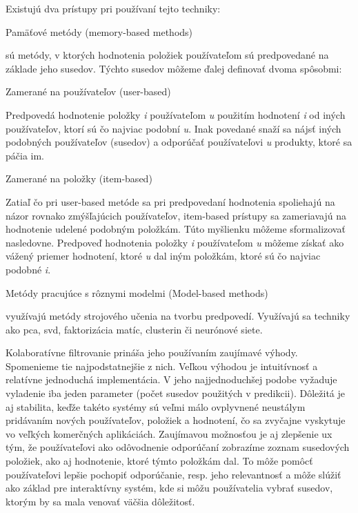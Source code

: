 Existujú dva prístupy pri používaní tejto techniky:
\begin{enumerate}
	{\bf \item Pamäťové metódy (memory-based methods)} sú metódy, v ktorých hodnotenia položiek používateľom sú predpovedané na základe jeho susedov. Týchto susedov môžeme ďalej definovať dvoma spôsobmi: \cite{rs3}
\begin{itemize}[leftmargin=*]
	{\bf \item Zamerané na používateľov (user-based)}\newline	
Predpovedá hodnotenie položky \textit{i} používateľom \textit{u} použitím hodnotení \textit{i} od iných používateľov, ktorí sú čo najviac podobní \textit{u}. Inak povedané snaží sa nájsť iných podobných používateľov (susedov) a odporúčať používateľovi \textit{u} produkty, ktoré sa páčia im.
	{\bf \item Zamerané na položky (item-based)} \newline
Zatiaľ čo pri user-based metóde sa pri predpovedaní hodnotenia spoliehajú na názor rovnako zmýšľajúcich používateľov, item-based prístupy sa zameriavajú na hodnotenie udelené podobným položkám. Túto myšlienku môžeme sformalizovať nasledovne. Predpoveď hodnotenia položky \textit{i} používateľom \textit{u} môžeme získať ako vážený priemer hodnotení, ktoré \textit{u} dal iným položkám, ktoré sú čo najviac podobné \textit{i}. \cite{rs1}
\end{itemize}
	{\bf \item Metódy pracujúce s rôznymi modelmi (Model-based methods)} využívajú metódy strojového učenia na tvorbu predpovedí. Využívajú sa techniky ako \acrshort{pca}, \acrshort{svd}, faktorizácia matíc, clusterin či neurónové siete. \cite{rs3} \\
\end{enumerate}

Kolaboratívne filtrovanie prináša jeho používaním zaujímavé výhody. Spomenieme tie najpodstatnejšie z nich. Veľkou výhodou je intuitívnosť a relatívne jednoduchá implementácia. V jeho najjednoduchšej podobe vyžaduje vyladenie iba jeden parameter (počet susedov použitých v predikcii). Dôležitá je aj stabilita, keďže takéto systémy sú veľmi málo ovplyvnené neustálym pridávaním nových používateľov, položiek a hodnotení, čo sa zvyčajne vyskytuje vo veľkých komerčných aplikáciách.
Zaujímavou možnosťou je aj zlepšenie \acrshort{ux} tým, že používateľovi ako odôvodnenie odporúčaní zobrazíme zoznam susedových položiek, ako aj hodnotenie, ktoré týmto položkám dal. To môže pomôcť používateľovi lepšie pochopiť odporúčanie, resp. jeho relevantnosť a môže slúžiť ako základ pre interaktívny systém, kde si môžu používatelia vybrať susedov, ktorým by sa mala venovať väčšia dôležitosť. \cite{rs1} \\


